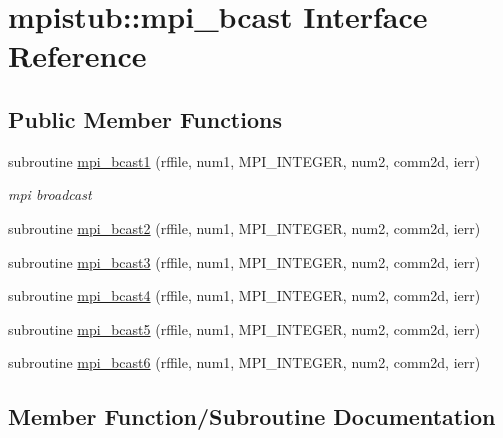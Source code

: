 \hypertarget{interfacempistub_1_1mpi__bcast}{}\section{mpistub\+::mpi\+\_\+bcast Interface Reference}
\label{interfacempistub_1_1mpi__bcast}
\subsection*{Public Member Functions}
\begin{DoxyCompactItemize}
\item 
subroutine \mbox{\hyperlink{interfacempistub_1_1mpi__bcast_a8a625c502574a57694e059e09a85905c}{mpi\+\_\+bcast1}} (rffile, num1, M\+P\+I\+\_\+\+I\+N\+T\+E\+G\+ER, num2, comm2d, ierr)
\begin{DoxyCompactList}\small\item\em mpi broadcast \end{DoxyCompactList}\item 
subroutine \mbox{\hyperlink{interfacempistub_1_1mpi__bcast_aaa0cc632dc25d1d3c5757c751024f9b2}{mpi\+\_\+bcast2}} (rffile, num1, M\+P\+I\+\_\+\+I\+N\+T\+E\+G\+ER, num2, comm2d, ierr)
\item 
subroutine \mbox{\hyperlink{interfacempistub_1_1mpi__bcast_af37e70cf2f9c41de612305131cd71d92}{mpi\+\_\+bcast3}} (rffile, num1, M\+P\+I\+\_\+\+I\+N\+T\+E\+G\+ER, num2, comm2d, ierr)
\item 
subroutine \mbox{\hyperlink{interfacempistub_1_1mpi__bcast_add6bd1eed6a7ff5a1068fce9b2711f93}{mpi\+\_\+bcast4}} (rffile, num1, M\+P\+I\+\_\+\+I\+N\+T\+E\+G\+ER, num2, comm2d, ierr)
\item 
subroutine \mbox{\hyperlink{interfacempistub_1_1mpi__bcast_a9bf7b06275e20b4971abba4693dd1212}{mpi\+\_\+bcast5}} (rffile, num1, M\+P\+I\+\_\+\+I\+N\+T\+E\+G\+ER, num2, comm2d, ierr)
\item 
subroutine \mbox{\hyperlink{interfacempistub_1_1mpi__bcast_a96892f1cb686f7bf3423a7446575097d}{mpi\+\_\+bcast6}} (rffile, num1, M\+P\+I\+\_\+\+I\+N\+T\+E\+G\+ER, num2, comm2d, ierr)
\end{DoxyCompactItemize}


\subsection{Member Function/\+Subroutine Documentation}
\mbox{\label{interfacempistub_1_1mpi__bcast_a8a625c502574a57694e059e09a85905c}} 
